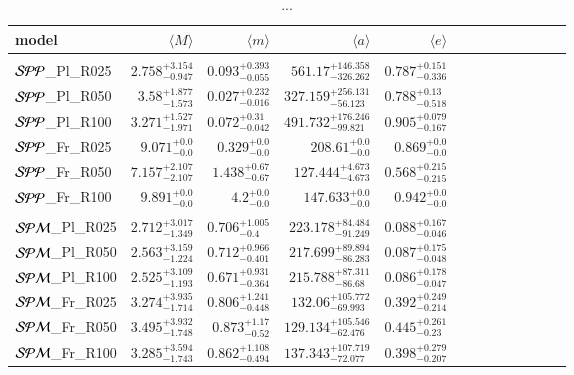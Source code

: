 \documentclass[aa]{lib/aa}
\begin{document}
\begin{table}
 \caption{...}
 \label{Tab:model_PP}
 \centering 
 \begin{tabular}{lrrrrrrrrrrrr}
 \hline\hline
model & $\langle M \rangle$ & $\langle m \rangle$ & $\langle a \rangle$ & $\langle e \rangle$ \\
        \hline \vspace{-0.75em}\\
${\cal SPP}$\_Pl\_R025 & $2.758^{+3.154}_{-0.947}$ & $0.093^{+0.393}_{-0.055}$ & $561.17^{+146.358}_{-326.262}$ & $0.787^{+0.151}_{-0.336}$ \\
${\cal SPP}$\_Pl\_R050 & $3.58^{+1.877}_{-1.573}$ & $0.027^{+0.232}_{-0.016}$ & $327.159^{+256.131}_{-56.123}$ & $0.788^{+0.13}_{-0.518}$ \\
${\cal SPP}$\_Pl\_R100 & $3.271^{+1.527}_{-1.971}$ & $0.072^{+0.31}_{-0.042}$ & $491.732^{+176.246}_{-99.821}$ & $0.905^{+0.079}_{-0.167}$ \\
${\cal SPP}$\_Fr\_R025 & $9.071^{+0.0}_{-0.0}$ & $0.329^{+0.0}_{-0.0}$ & $208.61^{+0.0}_{-0.0}$ & $0.869^{+0.0}_{-0.0}$ \\
${\cal SPP}$\_Fr\_R050 & $7.157^{+2.107}_{-2.107}$ & $1.438^{+0.67}_{-0.67}$ & $127.444^{+4.673}_{-4.673}$ & $0.568^{+0.215}_{-0.215}$ \\
${\cal SPP}$\_Fr\_R100 & $9.891^{+0.0}_{-0.0}$ & $4.2^{+0.0}_{-0.0}$ & $147.633^{+0.0}_{-0.0}$ & $0.942^{+0.0}_{-0.0}$ \\
  \hline \vspace{-0.75em} \\ 
${\cal SPM}$\_Pl\_R025 & $2.712^{+3.017}_{-1.349}$ & $0.706^{+1.005}_{-0.4}$ & $223.178^{+84.484}_{-91.249}$ & $0.088^{+0.167}_{-0.046}$ \\
${\cal SPM}$\_Pl\_R050 & $2.563^{+3.159}_{-1.224}$ & $0.712^{+0.966}_{-0.401}$ & $217.699^{+89.894}_{-86.283}$ & $0.087^{+0.175}_{-0.048}$ \\
${\cal SPM}$\_Pl\_R100 & $2.525^{+3.109}_{-1.193}$ & $0.671^{+0.931}_{-0.364}$ & $215.788^{+87.311}_{-86.68}$ & $0.086^{+0.178}_{-0.047}$ \\
${\cal SPM}$\_Fr\_R025 & $3.274^{+3.935}_{-1.714}$ & $0.806^{+1.241}_{-0.448}$ & $132.06^{+105.772}_{-69.993}$ & $0.392^{+0.249}_{-0.214}$ \\
${\cal SPM}$\_Fr\_R050 & $3.495^{+3.932}_{-1.748}$ & $0.873^{+1.17}_{-0.52}$ & $129.134^{+105.546}_{-62.476}$ & $0.445^{+0.261}_{-0.23}$ \\
${\cal SPM}$\_Fr\_R100 & $3.285^{+3.594}_{-1.743}$ & $0.862^{+1.108}_{-0.494}$ & $137.343^{+107.719}_{-72.077}$ & $0.398^{+0.279}_{-0.207}$ \\
  \hline
 \end{tabular}
\end{table}
\end{document}
